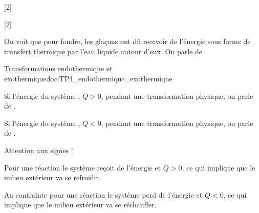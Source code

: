 [2]

[2]



On voit que pour fondre, les glaçons ont dû recevoir de l'énergie sous forme de transfert thermique par l'eau liquide autour d'eux.
On parle de 

\begin{doc}{Transformations endothermique et exothermique}{doc:TP1_endothermique_exothermique}
  \begin{importants}
    \begin{listePoints}
      \item Si l'énergie du système , $Q > 0$, pendant une transformation physique, on parle de .
      \item Si l'énergie du système , $Q < 0$, pendant une transformation physique, on parle de .
    \end{listePoints}
  \end{importants}
  \begin{center}
  \end{center}
  \attention Attention aux signes !
  
  \begin{listePoints}
    \item Pour une réaction  le système reçoit de l'énergie et $Q > 0$, ce qui implique que le milieu extérieur va se refroidir. 
    \item Au contrainte pour une réaction  le système perd de l'énergie et $Q < 0$, ce qui implique que le milieu extérieur va se réchauffer.
  \end{listePoints}
\end{doc}
